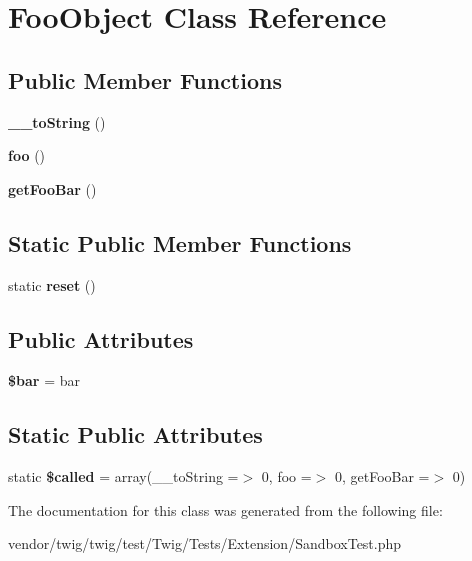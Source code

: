 \hypertarget{classFooObject}{}\section{Foo\+Object Class Reference}
\label{classFooObject}
\subsection*{Public Member Functions}
\begin{DoxyCompactItemize}
\item 
{\bfseries \+\_\+\+\_\+to\+String} ()\hypertarget{classFooObject_abe433a6dcd4d89429b5b2617a98e8b9c}{}\label{classFooObject_abe433a6dcd4d89429b5b2617a98e8b9c}

\item 
{\bfseries foo} ()\hypertarget{classFooObject_a97951b0bf68bf933870e2ce324ce3c09}{}\label{classFooObject_a97951b0bf68bf933870e2ce324ce3c09}

\item 
{\bfseries get\+Foo\+Bar} ()\hypertarget{classFooObject_a218656d30b83f6a39fb41a070bcc57f2}{}\label{classFooObject_a218656d30b83f6a39fb41a070bcc57f2}

\end{DoxyCompactItemize}
\subsection*{Static Public Member Functions}
\begin{DoxyCompactItemize}
\item 
static {\bfseries reset} ()\hypertarget{classFooObject_a2ac1a7094570a1c493ae2ac35921eaa9}{}\label{classFooObject_a2ac1a7094570a1c493ae2ac35921eaa9}

\end{DoxyCompactItemize}
\subsection*{Public Attributes}
\begin{DoxyCompactItemize}
\item 
{\bfseries \$bar} = \textquotesingle{}bar\textquotesingle{}\hypertarget{classFooObject_ac64e3e799a7656d33b36dc3355fb1710}{}\label{classFooObject_ac64e3e799a7656d33b36dc3355fb1710}

\end{DoxyCompactItemize}
\subsection*{Static Public Attributes}
\begin{DoxyCompactItemize}
\item 
static {\bfseries \$called} = array(\textquotesingle{}\+\_\+\+\_\+to\+String\textquotesingle{} =$>$ 0, \textquotesingle{}foo\textquotesingle{} =$>$ 0, \textquotesingle{}get\+Foo\+Bar\textquotesingle{} =$>$ 0)\hypertarget{classFooObject_accaba6d3c7b214f3694557b85dafb1a4}{}\label{classFooObject_accaba6d3c7b214f3694557b85dafb1a4}

\end{DoxyCompactItemize}


The documentation for this class was generated from the following file\+:\begin{DoxyCompactItemize}
\item 
vendor/twig/twig/test/\+Twig/\+Tests/\+Extension/Sandbox\+Test.\+php\end{DoxyCompactItemize}
